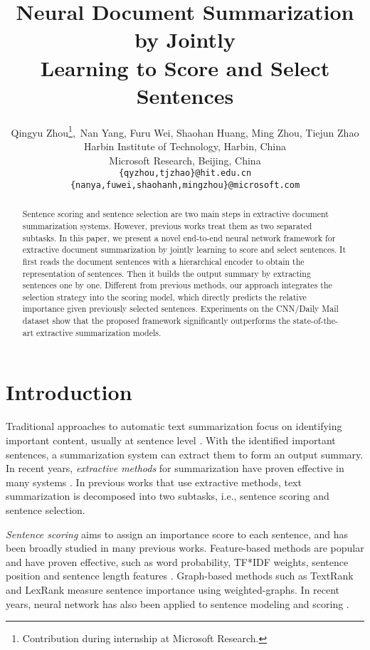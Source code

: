 \documentclass[11pt,a4paper]{article}
\title{Neural Document Summarization by Jointly \\Learning to Score and Select Sentences}
\author{Qingyu Zhou\thanks{\; Contribution during internship at Microsoft Research.},\, Nan Yang,  Furu Wei,  Shaohan Huang,  Ming Zhou,  Tiejun Zhao \\
	Harbin Institute of Technology, Harbin, China \\
	Microsoft Research, Beijing, China \\
	{\tt \{qyzhou,tjzhao\}@hit.edu.cn} \\ {\tt \{nanya,fuwei,shaohanh,mingzhou\}@microsoft.com}
}
\date{}
\begin{document}
\maketitle
\begin{abstract}
Sentence scoring and sentence selection are two main steps in extractive document summarization systems.
However, previous works treat them as two separated subtasks.
In this paper, we present a novel end-to-end neural network framework for extractive document summarization by jointly learning to score and select sentences.
It first reads the document sentences with a hierarchical encoder to obtain the representation of sentences.
Then it builds the output summary by extracting sentences one by one.
Different from previous methods, our approach integrates the selection strategy into the scoring model, which directly predicts the relative importance given previously selected sentences.
Experiments on the CNN/Daily Mail dataset show that the proposed framework significantly outperforms the state-of-the-art extractive summarization models.
\end{abstract}

\section{Introduction}


Traditional approaches to automatic text summarization focus on identifying important content, usually at sentence level \cite{nenkova2011automatic}.
With the identified important sentences, a summarization system can extract them to form an output summary.
In recent years, \textit{extractive methods} for summarization have proven effective in many systems \cite{carbonell1998use,mihalcea2004textrank,mcdonald2007study,cao2015ranking}.
In previous works that use extractive methods, text summarization is decomposed into two subtasks, i.e., sentence scoring and sentence selection.


\textit{Sentence scoring} aims to assign an importance score to each sentence, and has been broadly studied in many previous works.
Feature-based methods are popular and have proven effective, such as 
word probability, TF*IDF weights, sentence position and sentence length features \cite{luhn1958automatic,hovy1998automated,Ren:2017:LCS:3077136.3080792}.
Graph-based methods such as TextRank \cite{mihalcea2004textrank} and LexRank  \cite{erkan2004lexrank} measure sentence importance using weighted-graphs.
In recent years, neural network has also been applied to sentence modeling and scoring \cite{cao2015ranking,Ren:2017:LCS:3077136.3080792}.
\end{document}
